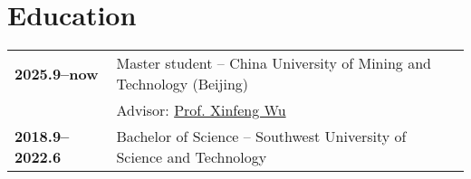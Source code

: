 \documentclass{article}
\newcommand{\sqbullet}{~\vrule height 1ex width .8ex depth -.2ex}
\newcommand{\cvsection}[1]{\section*{\rmfamily#1}}
\begin{document}
\cvsection{Education}
\begin{tabular}{ll}
    \bf{2025.9--now} & Master student -- {China University of Mining and Technology (Beijing)}\\
    & Advisor: \href{https://lxy.cumtb.edu.cn/info/1067/1219.htm}{\color{blue} Prof. Xinfeng Wu}\\[.5ex]
    \bf{2018.9--2022.6} & Bachelor of Science -- %
    {Southwest University of Science and Technology}\\
\end{tabular}




\end{document}
